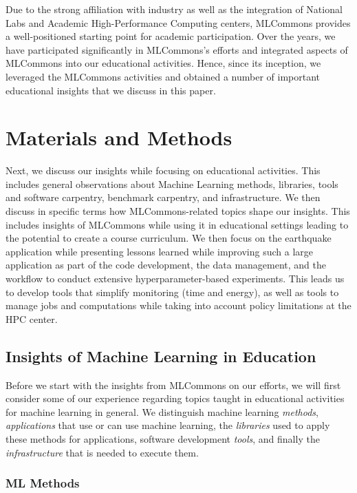 \documentclass[utf8]{FrontiersinVancouver} %
\begin{document}
Due to the strong affiliation with industry as well as the integration
of National Labs and Academic High-Performance Computing centers,
MLCommons provides a well-positioned starting point for academic
participation. Over the years, we have participated significantly in
MLCommons's efforts and integrated aspects of MLCommons into our
educational activities. Hence, since its inception, we leveraged the
MLCommons activities and obtained a number of important educational
insights that we discuss in this paper.


\section{Materials and Methods}

Next, we discuss our insights while focusing on educational activities. This includes general observations about Machine Learning methods, libraries, tools and software carpentry, benchmark carpentry, and infrastructure. We then discuss in specific terms how MLCommons-related topics shape our insights. This includes insights of MLCommons while using it in educational settings leading to the potential to create a course curriculum. We then focus on the earthquake application while presenting lessons learned while improving such a large application as part of the code development, the data management, and the workflow to conduct extensive hyperparameter-based experiments. This leads us to develop tools that simplify monitoring (time and energy), as well as tools to manage jobs and computations while taking into account policy limitations at the HPC center.

\subsection{Insights of Machine Learning in Education}
\label{sec:edu-ml}

Before we start with the insights from MLCommons on our efforts, we will first
consider some of our experience regarding topics taught in educational
activities for machine learning in general. We distinguish
machine learning {\em methods}, {\em applications} that use or can use
machine learning, the {\em libraries} used to apply these methods for
applications, software development {\em tools}, and finally the {\em
  infrastructure} that is needed to execute them.


\subsubsection{ML Methods}
\end{document}
